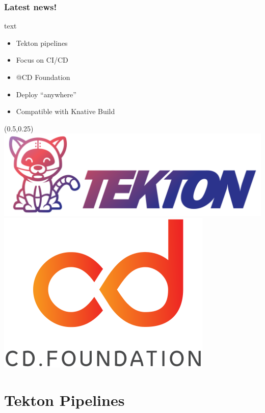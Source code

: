 \documentclass[aspectratio=169,11pt,hyperref={colorlinks=true}]{beamer}
\begin{document}
\begin{lblackrwhiteframe}
\begin{lblackrwhiteframe}
  \frametitle{Latest news!}
  \large
  \begin{beamercolorbox}[wd=0.3\paperwidth]{text}
    \begin{itemize}
      \item Tekton pipelines
      \item Focus on CI/CD
      \item @CD Foundation
      \item Deploy ``anywhere''
      \item Compatible with Knative Build
    \end{itemize}
  \end{beamercolorbox}%
  \begin{textblock*}{0.5\paperwidth}(0.5\paperwidth,0.25\paperheight)
    \centering
    \includegraphics[width=0.35\paperwidth]{img/tekton-horizontal-color.png}
    \includegraphics[width=0.20\paperwidth]{img/cdf-color.png}
  \end{textblock*}
\end{lblackrwhiteframe}

\section{Tekton Pipelines}


\end{lblackrwhiteframe}
\end{document}
